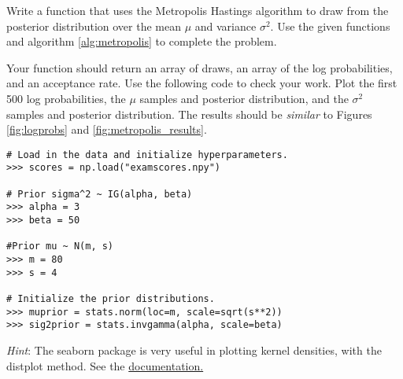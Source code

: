 \begin{comment}
\begin{figure}[h]
\centering
\texttt{[image: figures/logprobs.pdf]}
\caption{Log probabilities of our samples.}
\end{figure}

From this we can see that after between $300$ and $500$ iterations, we had converged to the correct distribution. We can visualize the path of our sampler by plotting the samples themselves:
\begin{figure}[h]
\centering
\texttt{[image: figures/samples.pdf]}
\caption{Samples from the Metropolis algorithm.}
\end{figure}

\begin{problem}
Using $\mu$ and $\Sigma$ as defined previously and using an initial state $\mathbf{x} = \left[ \begin{array}{cc} 1000 & -1000 \end{array} \right]$ run your Metropolis sampler for $10000$ iterations. Plot the log probs as well as the samples. How long did it take to converge?
\end{problem}
\end{comment}

\begin{problem}
Write a function that uses the Metropolis Hastings algorithm to draw from the posterior distribution over the mean $\mu$ and variance $\sigma^2$. Use the given functions and algorithm \ref{alg:metropolis} to complete the problem.

Your function should return an array of draws, an array of the log probabilities, and an acceptance rate. Use the following code to check your work. Plot the first 500 log probabilities, the $\mu$ samples and posterior distribution, and the $\sigma^2$ samples and posterior distribution. The results should be \textit{similar} to Figures \ref{fig:logprobs} and \ref{fig:metropolis_results}.


\begin{lstlisting}
# Load in the data and initialize hyperparameters.
>>> scores = np.load("examscores.npy")

# Prior sigma^2 ~ IG(alpha, beta)
>>> alpha = 3
>>> beta = 50

#Prior mu ~ N(m, s)
>>> m = 80
>>> s = 4

# Initialize the prior distributions.
>>> muprior = stats.norm(loc=m, scale=sqrt(s**2))
>>> sig2prior = stats.invgamma(alpha, scale=beta)
\end{lstlisting}

\textit{Hint}: The seaborn package is very useful in plotting kernel densities, with the distplot method. See the \href{https://seaborn.pydata.org/generated/seaborn.distplot.html}{documentation.}
\end{problem}

